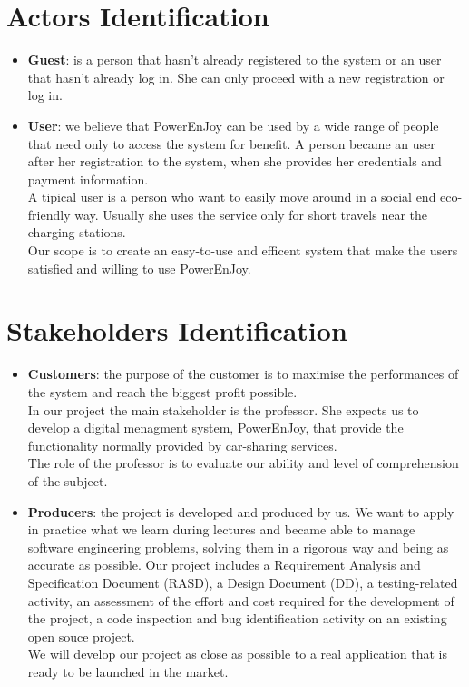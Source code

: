 \section{Actors Identification}
\begin{itemize}
	\item{{\bf Guest}: is a person that hasn't already registered to the system or an user that hasn't already log in. She can only proceed with a new registration or log in.}
	\item{{\bf User}: we believe that PowerEnJoy can be used by a wide range of people that need only to access the system for benefit. A person became an user after her registration to the system, when she provides her credentials and payment information. 
	\\A tipical user is a person who want to easily move around in a social end eco-friendly way. Usually she uses the service only for short travels near the \glspl{charging station}.
	\\Our scope is to create an easy-to-use and efficent system that make the users satisfied and willing to use PowerEnJoy.}
\end{itemize}

\section{Stakeholders Identification}
\begin{itemize}
	\item{{\bf Customers}: the purpose of the customer is to maximise the performances of the system and reach the biggest profit possible.
	\\In our project the main stakeholder is the professor. She expects us to develop a digital menagment system, PowerEnJoy, that provide the functionality normally provided by car-sharing services.  
	\\The role of the professor is to evaluate our ability and level of comprehension of the subject.}
	\item{{\bf Producers}: the project is developed and produced by us. We want to apply in practice what we learn during lectures and became able to manage software engineering problems, solving them in a rigorous way and being as accurate as possible. Our project includes a Requirement Analysis and Specification Document (RASD), a Design Document (DD), a testing-related activity, an
	assessment of the effort and cost required for the development of the project, a code inspection and bug identification activity on an existing open souce project. 
	\\We will develop our project as close as possible to a real application that is ready to be launched in the market.}
\end{itemize}
